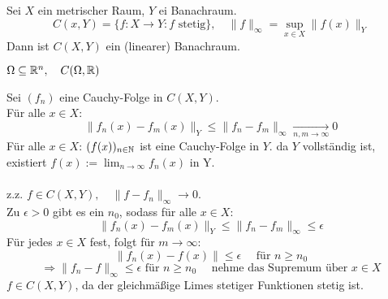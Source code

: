 \begin{prop}
	Sei $X$ ein metrischer Raum, $Y$ ei Banachraum.
	\[ C(x, Y) = \{ f : X \rightarrow Y: f \text{ stetig} \}, \quad \| f \|_{\infty} = \sup_{x \in X} \| f(x) \|_{Y} \]
	Dann ist $C(X, Y)$ ein (linearer) Banachraum.
\end{prop}


\begin{beispiel*}
	$\Omega \subseteq \mathbb{R}^{n}, \quad C(\Omega, \mathbb{R})$
	\begin{beweis}
		Sei $(f_{n})$ eine Cauchy-Folge in $C(X, Y)$. \\
		Für alle $x \in X$:
		\[ \| f_{n}(x) - f_{m}(x) \|_{Y} \leq \| f_{n} - f_{m} \|_{\infty} \xrightarrow[n, m \rightarrow \infty]{} 0 \]
		Für alle $x \in X$: $(f(x))_{n \in \mathbb{N}}$ ist eine Cauchy-Folge in $Y$.
		da $Y$ vollständig ist, existiert $f(x) := \lim_{n \rightarrow \infty} f_{n}(x)$ in Y. \\ \\
		z.z. $f \in C(X, Y), \quad \| f - f_{n} \|_{\infty} \rightarrow 0$. \\
		Zu $\epsilon > 0$ gibt es ein $n_{0}$, sodass für alle $x \in X$:
		\[ \| f_{n}(x) - f_{m}(x) \|_{Y} \leq \| f_{n} - f_{m} \|_{\infty} \leq \epsilon \]
		Für jedes $x \in X$ fest, folgt für $m \rightarrow \infty$:
		 \[ \| f_{n}(x) - f(x) \| \leq \epsilon \quad \text{ für } n \geq n_{0} \]
		 \[ \Rightarrow \| f_{n} - f \|_{\infty} \leq \epsilon \text{ für } n \geq n_{0} \quad  \text{ nehme das Supremum über } x \in X \]
		 $f \in C(X, Y)$, da der gleichmä{\ss}ige Limes stetiger Funktionen stetig ist.
	\end{beweis}
\end{beispiel*}



